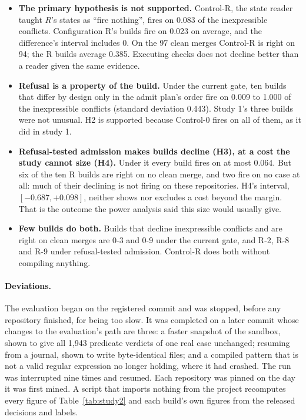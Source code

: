 \documentclass[11pt]{article}
\begin{document}
\begin{itemize}
  \item \textbf{The primary hypothesis is not supported.} Control-R, the state reader taught
  $R$'s states as ``fire nothing'', fires on 0.083 of the inexpressible conflicts. Configuration
  R's builds fire on 0.023 on average, and the difference's interval includes 0. On the 97 clean
  merges Control-R is right on 94; the R builds average 0.385. Executing checks does not decline
  better than a reader given the same evidence.
  \item \textbf{Refusal is a property of the build.} Under the current gate, ten builds that
  differ by design only in the admit plan's order fire on 0.009 to 1.000 of the inexpressible
  conflicts (standard deviation 0.443). Study 1's three builds were not unusual. H2 is supported
  because Control-0 fires on all of them, as it did in study 1.
  \item \textbf{Refusal-tested admission makes builds decline (H3), at a cost the study cannot
  size (H4).} Under it every build fires on at most 0.064. But six of the ten R builds are right on
  no clean merge, and two fire on no case at all: much of their declining is not firing on these
  repositories. H4's interval, $[-0.687, +0.098]$, neither shows nor excludes a cost beyond the
  margin. That is the outcome the power analysis said this size would usually give.
  \item \textbf{Few builds do both.} Builds that decline inexpressible conflicts and are right
  on clean merges are 0-3 and 0-9 under the current gate, and R-2, R-8 and R-9 under refusal-tested
  admission. Control-R does both without compiling anything.
\end{itemize}

\paragraph{Deviations.}
The evaluation began on the registered commit and was stopped, before any repository finished,
for being too slow. It was completed on a later commit whose changes to the evaluation's path are
three: a faster snapshot of the sandbox, shown to give all 1,943 predicate verdicts of one real
case unchanged; resuming from a journal, shown to write byte-identical files; and a compiled
pattern that is not a valid regular expression no longer holding, where it had crashed. The run
was interrupted nine times and resumed. Each repository was pinned on the day it was first mined.
A script that imports nothing from the project recomputes every figure of
Table~\ref{tab:study2} and each build's own figures from the released decisions and labels.
\end{document}
